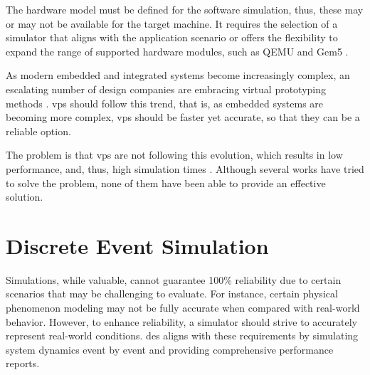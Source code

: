 The hardware model must be defined for the software simulation, thus, these may or may not be available for the target machine. It 
requires the selection of a simulator that aligns with the application scenario or offers the flexibility to expand the range of supported hardware 
modules, such as QEMU \cite{theQEMUsimulator} and Gem5 \cite{TheGem5Simulator}.

As modern embedded and integrated systems become increasingly complex, an escalating number of design companies are embracing virtual prototyping 
methods \cite{UltraFastVPs}. \Glspl{vp} should follow this trend, that is, as embedded systems are becoming more complex, \glspl{vp} should be 
faster yet accurate, so that they can be a reliable option.

The problem is that \glspl{vp} are not following this evolution, which results in low performance, and, thus, high simulation times \cite{pargem5} 
\cite{UltraFastVPs} \cite{optimizingTD}. Although several works have tried to solve the problem, none of them have been able to 
provide an effective solution.

 

\section{Discrete Event Simulation}




Simulations, while valuable, cannot guarantee 100\% reliability due to certain scenarios that may be challenging to evaluate. For instance, 
certain physical phenomenon modeling may not be fully accurate when compared with real-world behavior. However, to enhance reliability, a 
simulator should strive to accurately represent real-world conditions. \gls{des} aligns with these requirements by simulating system dynamics 
event by event and providing comprehensive performance reports.

